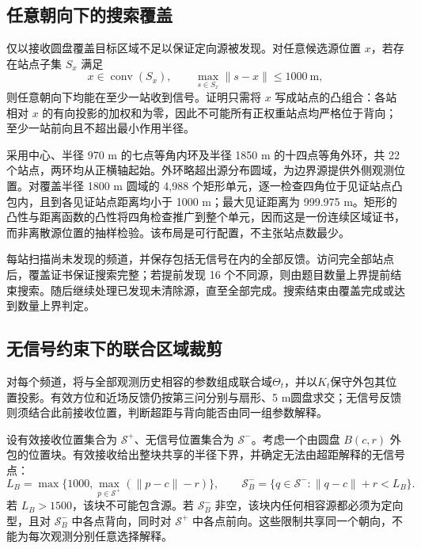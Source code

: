 \subsection{任意朝向下的搜索覆盖}

仅以接收圆盘覆盖目标区域不足以保证定向源被发现。对任意候选源位置 $x$，若存在站点子集 $S_x$ 满足
\begin{equation}
 x\in\operatorname{conv}(S_x),\qquad
 \max_{s\in S_x}\|s-x\|\le1000\ \mathrm m,
 \label{eq:q4r-cover}
\end{equation}
则任意朝向下均能在至少一站收到信号。证明只需将 $x$ 写成站点的凸组合：各站相对 $x$ 的有向投影的加权和为零，因此不可能所有正权重站点均严格位于背向；至少一站前向且不超出最小作用半径。

采用中心、半径 970 m 的七点等角内环及半径 1850 m 的十四点等角外环，共 22 个站点，两环均从正横轴起始。外环略超出源分布圆域，为边界源提供外侧观测位置。对覆盖半径 1800 m 圆域的 4,988 个矩形单元，逐一检查四角位于见证站点凸包内，且到各见证站点距离均小于 1000 m；最大见证距离为 999.975 m。矩形的凸性与距离函数的凸性将四角检查推广到整个单元，因而这是一份连续区域证书，而非离散源位置的抽样检验。该布局是可行配置，不主张站点数最少。

每站扫描尚未发现的频道，并保存包括无信号在内的全部反馈。访问完全部站点后，覆盖证书保证搜索完整；若提前发现 16 个不同源，则由题目数量上界提前结束搜索。随后继续处理已发现未清除源，直至全部完成。搜索结束由覆盖完成或达到数量上界判定。

\subsection{无信号约束下的联合区域裁剪}

对每个频道，将与全部观测历史相容的参数组成联合域$\Theta_t$，并以$K_t$保守外包其位置投影。有效方位和近场反馈仍按第三问分别与扇形、5 m圆盘求交；无信号反馈则须结合此前接收位置，判断超距与背向能否由同一组参数解释。

设有效接收位置集合为 $\mathcal S^+$、无信号位置集合为 $\mathcal S^-$。考虑一个由圆盘 $B(c,r)$ 外包的位置块。有效接收给出整块共享的半径下界，并确定无法由超距解释的无信号点：
\begin{equation}
 L_B=\max\{1000,\max_{p\in\mathcal S^+}(\|p-c\|-r)\},\qquad
 \mathcal S^-_B=\{q\in\mathcal S^-:\|q-c\|+r<L_B\}.
 \label{eq:q4r-forced}
\end{equation}
若 $L_B>1500$，该块不可能包含源。若 $\mathcal S^-_B$ 非空，该块内任何相容源都必须为定向型，且对 $\mathcal S^-_B$ 中各点背向，同时对 $\mathcal S^+$ 中各点前向。这些限制共享同一个朝向，不能为每次观测分别任意选择解释。

